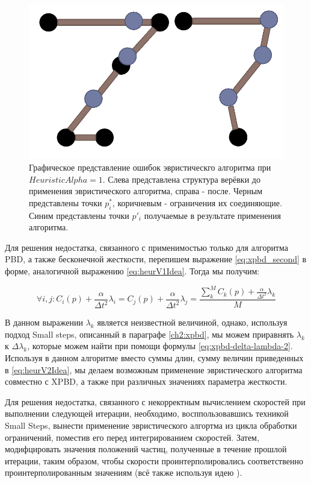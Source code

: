 	\begin{figure}[ht!] 
		\center
		\includegraphics [scale=0.35] {my_folder/images//heuristicSchemaFail}
		\caption{Графическое представление ошибок эвристическго алгоритма при $HeuristicAlpha = 1$. Слева представлена структура верёвки до применения эвристического алгоритма, справа - после. Черным представлены точки $p^*_i$, коричневым - ограничения их соединяющие. Синим представлены точки $p'_i$ получаемые в результате применения алгоритма.}
		\label{fig:heuristicSchemaFail}  
	\end{figure}	
	\FloatBarrier 
	
	Для решения недостатка, связанного с применимостью только для алгоритма PBD, а также бесконечной жесткости, перепишем выражение \ref{eq:xpbd_second} в форме, аналогичной выражению \ref{eq:heurV1Idea}. Тогда мы получим:
	
	\begin{equation} \label{eq:heurV2Idea}
		\forall i,j : C_i(p) + \frac{\alpha}{\Delta t^2}\lambda_i = C_j(p) + \frac{\alpha}{\Delta t^2}\lambda_j = \frac{\sum_k^M C_k(p) + \frac{\alpha}{\Delta t^2}\lambda_k}{M}
	\end{equation}
	
	В данном выражении $\lambda_k$ является неизвестной величиной, однако, используя подход Small steps, описанный в параграфе \ref{ch2:xpbd}, мы можем приравнять $\lambda_k$ к $\Delta \lambda_k$, которые можем найти при помощи формулы \ref{eq:xpbd-delta-lambda-2}. Используя в данном алгоритме вместо суммы длин, сумму величин приведенных в \ref{eq:heurV2Idea}, мы делаем возможным применение эвристического алгоритма совместно с XPBD, а также при различных значениях параметра жесткости.
	
	Для решения недостатка, связанного с некорректным вычислением скоростей при выполнении следующей итерации,  необходимо, восппользовавшись техникой Small Steps, вынести применение эвристического алгортма из цикла обработки ограничений, поместив его перед интегрированием скоростей. Затем, модифцировать значения положений частиц, полученные в течение прошлой итерации, таким образом, чтобы скорости проинтерполировались соответственно проинтерполированным значениям (всё также используя идею ).
	
